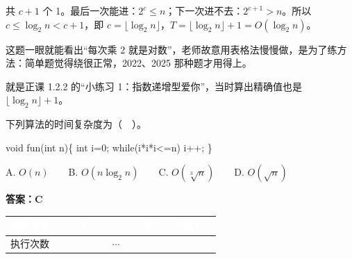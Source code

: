 \documentclass[10.5pt,a4paper,oneside]{article}
\newcommand{\hlred}[1]{\textcolor{wdred}{\bfseries #1}}
\newcommand{\cueblock}[2]{\Needspace{4\baselineskip}\leavevmode#1{#2}\par\vspace{-\baselineskip}\vspace{-\parskip}}
\newcommand{\cuebox}[1]{\leavevmode\llap{\smash{\begin{minipage}[t]{\marginparwidth}\raggedright\small\linespread{1.18}\selectfont #1\end{minipage}}\hspace{\marginparsep}}}
\newcommand{\cuenote}[1]{\cuebox{{\color{wdblue}\bfseries Q\,}\color{wddark}#1}}
\newenvironment{Shaded}{}{}
\newcommand{\ControlFlowTok}[1]{\textcolor[rgb]{0.12,0.31,0.71}{#1}}
\newcommand{\DataTypeTok}[1]{\textcolor[rgb]{0.12,0.31,0.71}{#1}}
\newcommand{\DecValTok}[1]{\textcolor[rgb]{0.77,0.35,0.07}{#1}}
\newcommand{\NormalTok}[1]{#1}
\newcommand{\OperatorTok}[1]{\textcolor[rgb]{0.20,0.20,0.20}{#1}}
\begin{document}
共 \(c+1\) 个
1。最后一次能进：\(2^c\le n\)；下一次进不去：\(2^{c+1}>n\)。所以
\(c\le\log_2 n<c+1\)，即
\(c=\lfloor\log_2 n\rfloor\)，\(T=\lfloor\log_2 n\rfloor+1=O(\log_2 n)\)。

\begin{videobox}

这题一眼就能看出“每次乘 2
就是对数”，老师故意用表格法慢慢做，是为了练方法：简单题觉得绕很正常，2022、2025
那种题才用得上。

\end{videobox}

\begin{recallbox}

就是正课 1.2.2 的“小练习 1：指数递增型爱你”，当时算出精确值也是
\(\lfloor\log_2 n\rfloor+1\)。

\end{recallbox}

\vspace{22pt}

\cueblock{\cuenote}{\relax{条件是 \(i^3\le n\)，循环几次？}}

\begin{questionbox}[07]

下列算法的时间复杂度为（　）。

\begin{Shaded}
\begin{Highlighting}[]
\DataTypeTok{void}\NormalTok{ fun}\OperatorTok{(}\DataTypeTok{int}\NormalTok{ n}\OperatorTok{)\{}
    \DataTypeTok{int}\NormalTok{ i}\OperatorTok{=}\DecValTok{0}\OperatorTok{;}
    \ControlFlowTok{while}\OperatorTok{(}\NormalTok{i}\OperatorTok{*}\NormalTok{i}\OperatorTok{*}\NormalTok{i}\OperatorTok{\textless{}=}\NormalTok{n}\OperatorTok{)}
\NormalTok{        i}\OperatorTok{++;}
\OperatorTok{\}}
\end{Highlighting}
\end{Shaded}

A. \(O(n)\)　　B. \(O(n\log_2 n)\)　　C. \(O(\sqrt[3]{n})\)　　D.
\(O(\sqrt n)\)

\end{questionbox}

\hlred{\textbf{答案：C}}

{
\begin{xltabular}{\linewidth}{>{\hsize\raggedright\arraybackslash}X>{\hsize\raggedright\arraybackslash}X>{\hsize\raggedright\arraybackslash}X>{\hsize\raggedright\arraybackslash}X>{\hsize\raggedright\arraybackslash}X>{\hsize\raggedright\arraybackslash}X}
\textcolor{white}{\bfseries 循环变量 \(i\)} & \textcolor{white}{\bfseries 0} & \textcolor{white}{\bfseries 1} & \textcolor{white}{\bfseries 2} & \textcolor{white}{\bfseries \(\cdots\)} & \textcolor{white}{\bfseries \(c\)（最后一次进入）} \\
\endfirsthead
执行次数 & 1 & 1 & 1 & \(\cdots\) & 1 \\ \hline
\end{xltabular}\par\vspace{4pt}}
\end{document}
